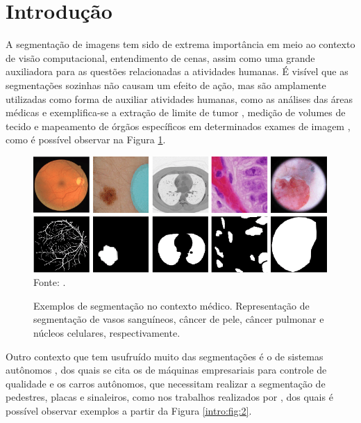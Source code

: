 \newpage
\clearpage
\section{Introdução}
\label{intro:intro}

A segmentação de imagens tem sido de extrema importância em meio ao contexto de visão computacional, entendimento de cenas, assim como uma grande auxiliadora para as questões relacionadas a atividades humanas. É visível que as segmentações sozinhas não causam um efeito de ação, mas são amplamente utilizadas como forma de auxiliar atividades humanas, como as análises das áreas médicas \cite{Lai2015, Withey2008} e exemplifica-se a extração de limite de tumor \cite{Malkanthi2017}, medição de volumes de tecido e mapeamento de órgãos específicos em determinados exames de imagem \cite{Gibson2018, Schoppe2020}, como é possível observar na Figura \ref{intro:fig:1}.

\begin{figure}[H]
    \centering
    \caption{Exemplos de segmentação no contexto médico. Representação de segmentação de vasos sanguíneos, câncer de pele, câncer pulmonar e núcleos celulares, respectivamente.}
    \includegraphics[width=1\linewidth]{recursos/imagens/introduction/medical-image-segmentation.png}
    \label{intro:fig:1}
    Fonte: \cite{Asadi-Aghbolaghi2020}.
\end{figure}

Outro contexto que tem usufruído muito das segmentações é o de sistemas autônomos \cite{Kaymak2019, Liu2020, Pan2020, Teichmann2018}, dos quais se cita os de máquinas empresariais para controle de qualidade e os carros autônomos, que necessitam realizar a segmentação de pedestres, placas e sinaleiros, como nos trabalhos realizados por \cite{Lee2018, Fleyeh2004, Pan2020}, dos quais é possível observar exemplos a partir da Figura \ref{intro:fig:2}.

